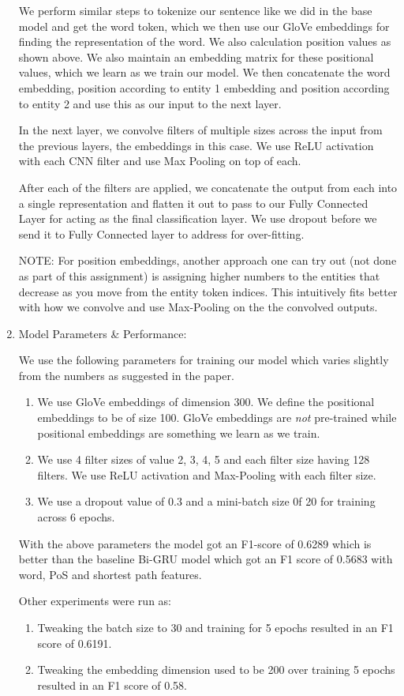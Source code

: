 \documentclass[11pt]{article}
\begin{document}
\begin{enumerate}
We perform similar steps to tokenize our sentence like we did in the base model and get the word token, which we then use our GloVe embeddings for finding the representation of the word. We also calculation position values as shown above. We also maintain an embedding matrix for these positional values, which we learn as we train our model. We then concatenate the word embedding, position according to entity 1 embedding and position according to entity 2 and use this as our input to the next layer.

In the next layer, we convolve filters of multiple sizes across the input from the previous layers, the embeddings in this case. We use ReLU activation with each CNN filter and use Max Pooling on top of each.

After each of the filters are applied, we concatenate the output from each into a single representation and flatten it out to pass to our Fully Connected Layer for acting as the final classification layer. We use dropout before we send it to Fully Connected layer to address for over-fitting.

NOTE: For position embeddings, another approach one can try out (not done as part of this assignment) is assigning higher numbers to the entities that decrease as you move from the entity token indices. This intuitively fits better with how we convolve and use Max-Pooling on the the convolved outputs.

\item Model Parameters \& Performance:

We use the following parameters for training our model which varies slightly from the numbers as suggested in the paper.

\begin{enumerate}
\item We use GloVe embeddings of dimension 300. We define the positional embeddings to be of size 100. GloVe embeddings are \textit{not} pre-trained while positional embeddings are something we learn as we train.

\item We use 4 filter sizes of value 2, 3, 4, 5 and each filter size having 128 filters. We use ReLU activation and Max-Pooling with each filter size.

\item We use a dropout value of 0.3 and a mini-batch size 0f 20 for training across 6 epochs.
\end{enumerate}

With the above parameters the model got an F1-score of 0.6289 which is better than the baseline Bi-GRU model which got an F1 score of 0.5683 with word, PoS and shortest path features.

Other experiments were run as:
\begin{enumerate}
\item Tweaking the batch size to 30 and training for 5 epochs resulted in an F1 score of 0.6191.
\item Tweaking the embedding dimension used to be 200 over training 5 epochs resulted in an F1 score of 0.58.
\end{enumerate}

\end{enumerate}
\end{document}
